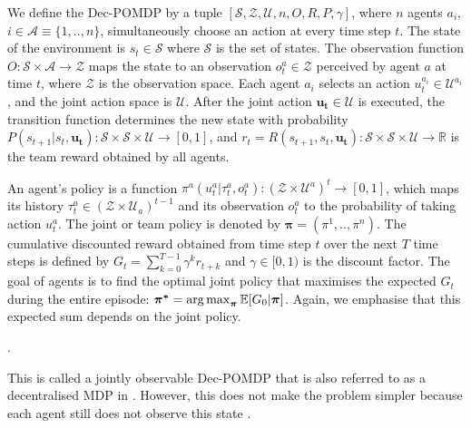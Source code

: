 We define the Dec-POMDP by a tuple $[\mathcal{S}, \mathcal{Z}, \mathcal{U}, n, O, R, P, \gamma]$, where $n$ agents $a_i$, $i \in \mathcal{A} \equiv \{1,..,n\}$, simultaneously choose an action at every time step $t$.
The state of the environment is $s_t \in \mathcal{S}$ where $\mathcal{S}$ is the set of states.
The observation function $O: \mathcal{S} \times \mathcal{A} \rightarrow \mathcal{Z}$ maps the state to an observation $o_t^{a} \in \mathcal{Z}$ perceived by agent $a$ at time $t$, where $\mathcal{Z}$ is the observation space.
Each agent $a_i$ selects an action $u_t^{a_i} \in \mathcal{U}^{a_i}$, and the joint action space is $\mathcal{U}$.
After the joint action $\boldsymbol{u_t} \in \mathcal{U}$ is executed, the transition function determines the new state with probability $P(s_{t+1}|s_t, \boldsymbol{u_t}): \mathcal{S} \times \mathcal{S} \times\mathcal{U} \rightarrow  [0,1] $, and $r_t=R(s_{t+1}, s_t, \boldsymbol {u_t}): \mathcal{S} \times \mathcal{S} \times \mathcal{U} \rightarrow \mathbb{R}$ is the team reward obtained by all agents.

An agent's policy is a function $\pi^{a}(u_t^{a}|\tau_t^{a},o_t^{a}): (\mathcal{Z} \times \mathcal{U}^a)^t \rightarrow [0,1]$, which maps its history $\tau_t^{a} \in (\mathcal{Z} \times \mathcal{U}_a)^{t-1}$ and its observation $o_t^{a}$ to the probability of taking action $u_t^{a}$. 
The joint or team policy is denoted by $\boldsymbol{\pi}=(\pi^1,..,\pi^n)$.
The cumulative discounted reward obtained from time step $t$ over the next $T$ time steps is defined by $G_{t} = \sum_{k=0}^{T-1} \gamma^k r_{t+k}$ and $\gamma \in [0, 1)$ is the discount factor.
The goal of agents is to find the optimal joint policy that maximises the expected $G_t$ during the entire episode: $\boldsymbol{\pi^{*}} =\operatorname*{arg\,max}_{\boldsymbol{\pi}} \mathbb{E}[G_0|\boldsymbol{\pi}]$.
Again, we emphasise that this expected sum depends on the joint policy.

.

This is called a jointly observable Dec-POMDP that is also referred to as a decentralised MDP in \citep{DecPomdp}.
However, this does not make the problem simpler because each agent still does not observe this state \citep{bernstein2002complexity}.

